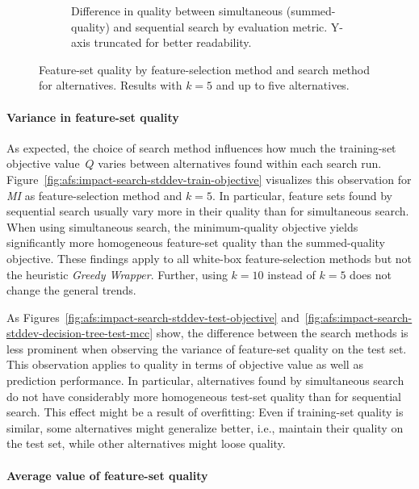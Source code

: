 \documentclass{article}
\theoremstyle{definition}
\begin{document}
\begin{figure}[htb]
\begin{subfigure}[t]{0.48\textwidth}
		\caption{
			Difference in quality between simultaneous (summed-quality) and sequential search by evaluation metric.
			Y-axis truncated for better readability.
		}
		\label{fig:afs:impact-search-fs-method-metric-diff}
	\end{subfigure}
	\caption{
		Feature-set quality by feature-selection method and search method for alternatives.
		Results with $k=5$ and up to five alternatives.
	}
	\label{fig:afs:impact-search-fs-method-quality}
\end{figure}

\paragraph{Variance in feature-set quality}

As expected, the choice of search method influences how much the training-set objective value~$Q$ varies between alternatives found within each search run.
Figure~\ref{fig:afs:impact-search-stddev-train-objective} visualizes this observation for \emph{MI} as feature-selection method and $k=5$.
In particular, feature sets found by sequential search usually vary more in their quality than for simultaneous search.
When using simultaneous search, the minimum-quality objective yields significantly more homogeneous feature-set quality than the summed-quality objective.
These findings apply to all white-box feature-selection methods but not the heuristic \emph{Greedy Wrapper}.
Further, using $k=10$ instead of $k=5$ does not change the general trends.

As Figures~\ref{fig:afs:impact-search-stddev-test-objective} and~\ref{fig:afs:impact-search-stddev-decision-tree-test-mcc} show, the difference between the search methods is less prominent when observing the variance of feature-set quality on the test set.
This observation applies to quality in terms of objective value as well as prediction performance.
In particular, alternatives found by simultaneous search do not have considerably more homogeneous test-set quality than for sequential search.
This effect might be a result of overfitting:
Even if training-set quality is similar, some alternatives might generalize better, i.e., maintain their quality on the test set, while other alternatives might loose quality.

\paragraph{Average value of feature-set quality}
\end{document}
